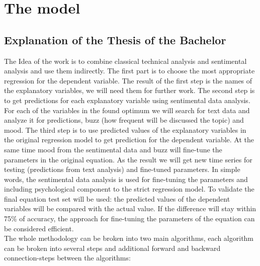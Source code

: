 \documentclass[12pt, a4paper]{article}
\begin{document}
\newpage
\section{The model}
\subsection{Explanation of the Thesis of the Bachelor}
The Idea of the work is to combine classical technical analysis and sentimental analysis and use them indirectly. The first part is to choose the most appropriate regression for the dependent variable. The result of the first step is the names of the explanatory variables, we will need them for further work. The second step is to get predictions for each explanatory variable using sentimental data analysis. For each of the variables in the found optimum we will search for text data and analyze it for predictions, buzz (how frequent will be discussed the topic) and mood. The third step is to use predicted values of the explanatory variables in the original regression model to get prediction for the dependent variable. At the same time mood from the sentimental data and buzz will fine-tune the parameters in the original equation. As the result we will get new time series for testing (predictions from text analysis) and fine-tuned parameters. In simple words, the sentimental data analysis is used for fine-tuning the parameters and including psychological component to the strict regression model. To validate the final equation test set will be used: the predicted values of the dependent variables will be compared with the actual value. If the difference will stay within 75\% of accuracy, the approach for fine-tuning the parameters of the equation can be considered efficient.\\
The whole methodology can be broken into two main algorithms, each algorithm can be broken into several steps and additional forward and backward connection-steps between the algorithms:
\end{document}
